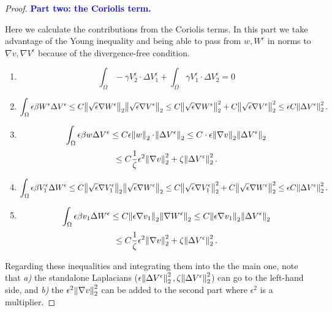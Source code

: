 \documentclass[11pt]{article}
\begin{document}
\begin{proof}
\textcolor{blue}{\textbf{Part two: the Coriolis term.}}

Here we calculate the contributions from the Coriolis terms. In this part we take advantage of the Young inequality and being able to pass from $w, W^\epsilon$ in norms to $\nabla v, \nabla V^\epsilon$ because of the divergence-free condition.

\begin{enumerate}

  \item $$\int_\Omega - \gamma V_2^\epsilon \cdot \Delta V_1^\epsilon + \int_\Omega  \gamma V_1^\epsilon \cdot \Delta V_2^\epsilon = 0$$
  
  \item $$ \int_\Omega \epsilon \beta W^\epsilon \Delta V^\epsilon \leq C \norm{\sqrt{\epsilon} \nabla W^\epsilon}_2 \norm{\sqrt{\epsilon} \nabla V^\epsilon}_2 \leq C \norm{\sqrt{\epsilon} \nabla W^\epsilon}^2_2 + C \norm{\sqrt{\epsilon}\nabla V^\epsilon}^2_2 \leq \epsilon C \norm{\Delta V^\epsilon}^2_2.$$
  
  \item $$ \int_\Omega \epsilon \beta w \Delta V^\epsilon \leq C \epsilon \norm{w}_2 \cdot \norm{\Delta V^\epsilon}_2 \leq C \cdot \epsilon \norm{\nabla v}_2 \norm{\Delta V^\epsilon}_2 $$
  $$ \leq C \frac{1}{\zeta} \epsilon^2 \norm{\nabla v}_2^2 + \zeta \norm{\Delta V^\epsilon}^2_2.$$
  
  \item $$ \int_\Omega \epsilon \beta V^\epsilon_1 \Delta W^\epsilon \leq C \norm{\sqrt{\epsilon} \nabla V^\epsilon_1}_2 \norm{\sqrt{\epsilon} \nabla W^\epsilon}_2 \leq C \norm{\sqrt{\epsilon} \nabla V^\epsilon_1}^2_2 + C \norm{ \sqrt{\epsilon} \nabla W^\epsilon}^2_2 \leq \epsilon C \norm{\Delta V^\epsilon}^2_2.$$
  
  \item $$ \int_\Omega \epsilon \beta v_1 \Delta W^\epsilon \leq C \norm{\epsilon \nabla v_1}_2 \norm{\nabla W^\epsilon}_2 \leq C \norm{\epsilon \nabla v_1}_2 \norm{\Delta V^\epsilon}_2 $$
  $$ \leq C \frac{1}{\zeta} \epsilon^2 \norm{\nabla v}_2^2 + \zeta \norm{\Delta V^\epsilon}^2_2.$$
  
\end{enumerate}

Regarding these inequalities and integrating them into the the main one, note that \textit{a)} the standalone Laplacians ($\epsilon \norm{\Delta V^\epsilon}^2_2, \zeta \norm{\Delta V^\epsilon}^2_2$) can go to the left-hand side, and \textit{b)} the $\epsilon^2 \norm{\nabla v}^2_2$ can be added to the second part where $\epsilon^2$ is a multiplier.


\end{proof}
\end{document}
